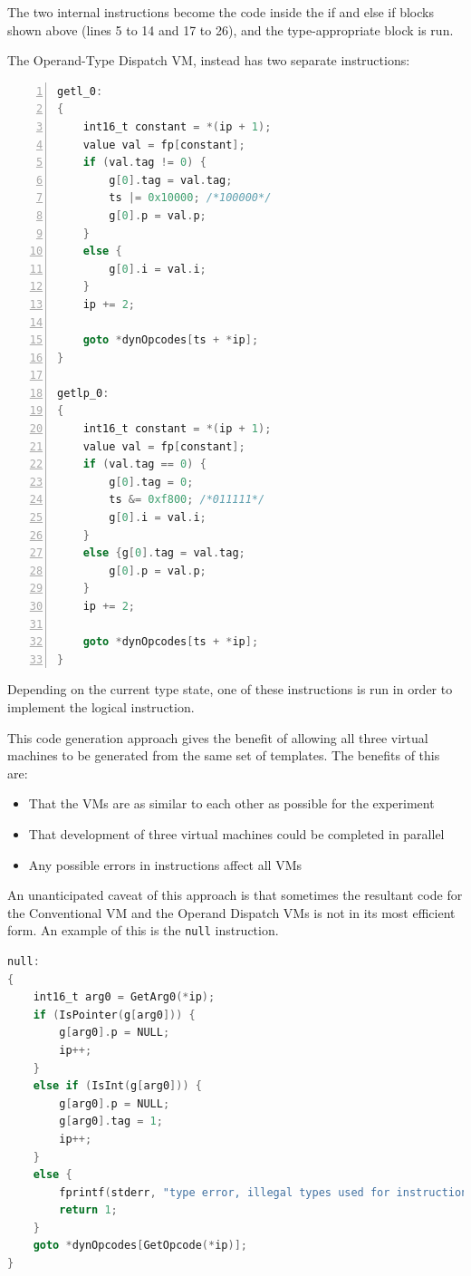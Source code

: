 \documentclass[english,a4paper,12pt]{report}
\begin{document}
The two internal instructions become the code inside the if and else
if blocks shown above (lines 5 to 14 and 17 to 26), and the
type-appropriate block is run.

The Operand-Type Dispatch VM, instead has two separate instructions:
\begin{lstlisting}[language=C,numbers=left,frame=single]
getl_0:
{
    int16_t constant = *(ip + 1);
    value val = fp[constant];
    if (val.tag != 0) {
        g[0].tag = val.tag;
        ts |= 0x10000; /*100000*/
        g[0].p = val.p;
    }
    else {
        g[0].i = val.i;
    }
    ip += 2;

    goto *dynOpcodes[ts + *ip];
}

getlp_0:
{
    int16_t constant = *(ip + 1);
    value val = fp[constant];
    if (val.tag == 0) {
        g[0].tag = 0;
        ts &= 0xf800; /*011111*/
        g[0].i = val.i;
    }
    else {g[0].tag = val.tag;
        g[0].p = val.p;
    }
    ip += 2;

    goto *dynOpcodes[ts + *ip];
}
\end{lstlisting}

Depending on the current type state, one of these instructions is run
in order to implement the logical instruction.

This code generation approach gives the benefit of allowing all three
virtual machines to be generated from the same set of templates. The
benefits of this are:
\begin{itemize}
\item That the VMs are as similar to each other as possible for the
  experiment
\item That development of three virtual machines could be completed in
  parallel
\item Any possible errors in instructions affect all VMs
\end{itemize}

An unanticipated caveat of this approach is that sometimes the
resultant code for the Conventional VM and the Operand Dispatch VMs is
not in its most efficient form. An example of this is the \verb|null|
instruction.

\begin{lstlisting}[language=C]
null:
{
    int16_t arg0 = GetArg0(*ip);
    if (IsPointer(g[arg0])) {
        g[arg0].p = NULL;
        ip++;
    }
    else if (IsInt(g[arg0])) {
        g[arg0].p = NULL;
        g[arg0].tag = 1;
        ip++;
    }
    else {
        fprintf(stderr, "type error, illegal types used for instruction: null");
        return 1;
    }
    goto *dynOpcodes[GetOpcode(*ip)];
}
\end{lstlisting}
\end{document}
